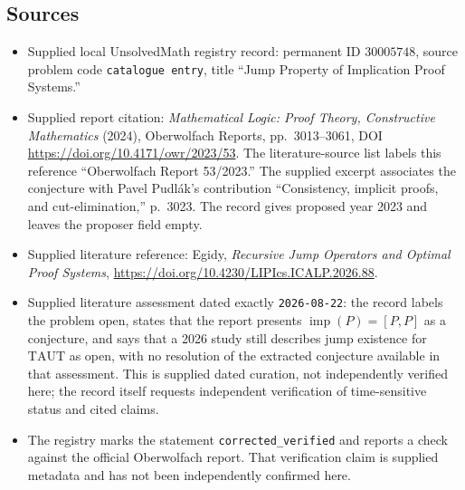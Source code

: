 \documentclass[11pt]{article}
\begin{document}
\subsection{Sources}
\begin{itemize}
\item Supplied local UnsolvedMath registry record: permanent ID \(30005748\), source problem code \texttt{catalogue entry}, title ``Jump Property of Implication Proof Systems.''
\item Supplied report citation: \emph{Mathematical Logic: Proof Theory, Constructive Mathematics} (2024), Oberwolfach Reports, pp.\ 3013--3061, DOI \url{https://doi.org/10.4171/owr/2023/53}. The literature-source list labels this reference ``Oberwolfach Report 53/2023.'' The supplied excerpt associates the conjecture with Pavel Pudl\'ak's contribution ``Consistency, implicit proofs, and cut-elimination,'' p.\ 3023. The record gives proposed year 2023 and leaves the proposer field empty.
\item Supplied literature reference: Egidy, \emph{Recursive Jump Operators and Optimal Proof Systems}, \url{https://doi.org/10.4230/LIPIcs.ICALP.2026.88}.
\item Supplied literature assessment dated exactly \texttt{2026-08-22}: the record labels the problem open, states that the report presents \(\operatorname{imp}(P)=[P,P]\) as a conjecture, and says that a 2026 study still describes jump existence for \(\mathrm{TAUT}\) as open, with no resolution of the extracted conjecture available in that assessment. This is supplied dated curation, not independently verified here; the record itself requests independent verification of time-sensitive status and cited claims.
\item The registry marks the statement \texttt{corrected\_verified} and reports a check against the official Oberwolfach report. That verification claim is supplied metadata and has not been independently confirmed here.
\end{itemize}
\end{document}

